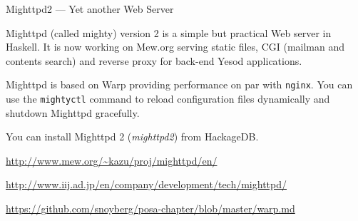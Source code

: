 \begin{hcarentry}{Mighttpd2 --- Yet another Web Server}
\label{mighttpd2}
\makeheader

Mighttpd (called mighty) version 2 is a simple but practical Web server in Haskell.
It is now working on Mew.org serving static files, CGI (mailman and contents search) and reverse proxy for back-end Yesod applications.

Mighttpd is based on Warp providing
performance on par with {\tt nginx}.
You can use the {\tt mightyctl} command to
reload configuration files dynamically and shutdown Mighttpd gracefully.

You can install Mighttpd 2 ({\it mighttpd2}) from HackageDB.

\FurtherReading
\begin{compactitem}
\item \url{http://www.mew.org/~kazu/proj/mighttpd/en/}
\item \url{http://www.iij.ad.jp/en/company/development/tech/mighttpd/}
\item \url{https://github.com/snoyberg/posa-chapter/blob/master/warp.md}
\end{compactitem}
\end{hcarentry}
